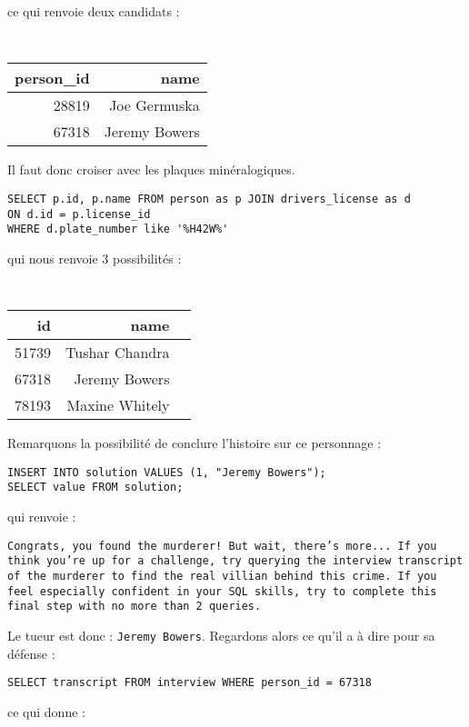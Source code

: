 ce qui renvoie deux candidats :

\begin{table}[!htp]
\centering
{\tt
\begin{tabular}{rr}
person\_id& name\\ \hline
28819& Joe Germuska \\
67318& Jeremy Bowers \\
\end{tabular}
}
\end{table}

Il faut donc croiser avec les plaques minéralogiques.

\begin{verbatim}
SELECT p.id, p.name FROM person as p JOIN drivers_license as d
ON d.id = p.license_id
WHERE d.plate_number like '%H42W%'
\end{verbatim}
qui nous renvoie 3 possibilités :

\begin{table}[!htp]
\centering
{\tt
\begin{tabular}{rrr}
id& name \\ \hline
51739& Tushar Chandra \\
67318& Jeremy Bowers \\
78193& Maxine Whitely\\
\end{tabular}
}
\end{table}



Remarquons la possibilité de conclure l'histoire sur ce personnage :
\begin{verbatim}
INSERT INTO solution VALUES (1, "Jeremy Bowers");
SELECT value FROM solution;
\end{verbatim}
qui renvoie : 

{\tt Congrats, you found the murderer! But wait, there's more... If you think you're up for a challenge, try querying the interview transcript of the murderer to find the real villian behind this crime. If you feel especially confident in your SQL skills, try to complete this final step with no more than 2 queries. }



Le tueur est donc : \texttt{Jeremy Bowers}. Regardons alors ce qu'il a à dire pour sa défense :

\begin{verbatim}
SELECT transcript FROM interview WHERE person_id = 67318
\end{verbatim}
ce qui donne :

